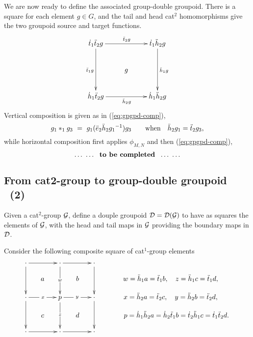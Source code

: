 \bigskip
We are now ready to define the associated group-double groupoid.
There is a square for each element  $g \in G$, 
and the tail and head cat$^2$ homomorphisms give the two groupoid 
source and target functions.
$$
\xymatrix{
\dtto\ddttt g \ar[rr]^{\ddttt g} \ar[dd]_{\ddtto g} 
  &   & \dtto\ddhht g \ar[dd]^{\ddhho g} \\
  & g & \\
\dhho\ddttt g \ar[rr]_{\ddhht g} 
  &   & \dhho\ddhht g \\
}
$$
Vertical composition is given as in (\ref{eq:gpgpd-comp}),
$$
g_1 *_1 g_3 ~=~ g_1(\ddot{e}_2\ddot{h}_2{g_1}^{-1})g_3 
\qquad\mbox{when}\quad
\ddot{h}_2 g_1 = \ddot{t}_2 g_3,
$$
while horizontal composition first applies $\phi_{M,N}$ 
and then (\ref{eq:gpgpd-comp}),
$$
\ldots~\ldots ~~\mbox{{\bf to be completed}} ~~\ldots~\ldots
$$



\newpage
\subsection{From cat2-group to group-double groupoid ~(2)}

Given a cat$^2$-group $\mathcal{G}$,  define a douple groupoid 
$\mathcal{D} = \mathcal{D}(\mathcal{G})$ to have as squares the elements of $\mathcal{G}$, 
with the head and tail maps in $\mathcal{G}$ providing the 
boundary maps in $\mathcal{D}$.

Consider the following composite square of cat$^1$-group elements
$$
\xymatrix  @C=1.2pc @R=0.8pc{
\cdot \ar[rr] \ar[dd]
  &   & \cdot \ar[rr] \ar[dd]|{\phantom{gZ}w\phantom{gZ}}
          &   & \cdot \ar[dd] 
                 &   &  \\
  & a &   & b &  &   &  w = \ddhho a = \ddtto b,\quad
                        z = \ddhho c = \ddtto d, \hspace{6mm}\\
\cdot \ar[rr]|{~x~} \ar[dd] 
  &   & p \ar[rr]|{~y~} \ar[dd]|{\phantom{gZ}z\phantom{gZ}}
          &   & \cdot \ar[dd] 
                 &   &  x = \ddhht a = \ddttt c,\quad
                        y = \ddhht b = \ddttt d, \hspace{6mm}
\\
  & c &   & d &  &   &  p = \dhho\ddhht a = \dhht\ddtto b 
                          = \dttt\ddhho c = \dtto\ddttt d. \\
\cdot \ar[rr] 
  &   & \cdot \ar[rr] 
          &   & \cdot 
                 &   &  \\
}
$$

